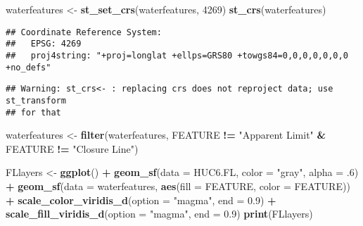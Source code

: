\documentclass[]{article}
\newenvironment{Shaded}{\begin{snugshade}}{\end{snugshade}}
\newcommand{\DataTypeTok}[1]{\textcolor[rgb]{0.13,0.29,0.53}{#1}}
\newcommand{\DecValTok}[1]{\textcolor[rgb]{0.00,0.00,0.81}{#1}}
\newcommand{\FloatTok}[1]{\textcolor[rgb]{0.00,0.00,0.81}{#1}}
\newcommand{\KeywordTok}[1]{\textcolor[rgb]{0.13,0.29,0.53}{\textbf{#1}}}
\newcommand{\NormalTok}[1]{#1}
\newcommand{\OperatorTok}[1]{\textcolor[rgb]{0.81,0.36,0.00}{\textbf{#1}}}
\newcommand{\StringTok}[1]{\textcolor[rgb]{0.31,0.60,0.02}{#1}}
\begin{document}
\begin{Shaded}
\begin{Highlighting}[]
\NormalTok{waterfeatures <-}\StringTok{ }\KeywordTok{st_set_crs}\NormalTok{(waterfeatures, }\DecValTok{4269}\NormalTok{)}
\KeywordTok{st_crs}\NormalTok{(waterfeatures)}
\end{Highlighting}
\end{Shaded}

\begin{verbatim}
## Coordinate Reference System:
##   EPSG: 4269 
##   proj4string: "+proj=longlat +ellps=GRS80 +towgs84=0,0,0,0,0,0,0 +no_defs"
\end{verbatim}

\begin{Shaded}
\end{Shaded}

\begin{verbatim}
## Warning: st_crs<- : replacing crs does not reproject data; use st_transform
## for that
\end{verbatim}

\begin{Shaded}
\begin{Highlighting}[]
\NormalTok{waterfeatures <-}\StringTok{ }\KeywordTok{filter}\NormalTok{(waterfeatures, FEATURE }\OperatorTok{!=}\StringTok{ "Apparent Limit"} \OperatorTok{&}\StringTok{ }\NormalTok{FEATURE }\OperatorTok{!=}\StringTok{ "Closure Line"}\NormalTok{)}

\NormalTok{FLlayers <-}\StringTok{ }\KeywordTok{ggplot}\NormalTok{() }\OperatorTok{+}
\StringTok{  }\KeywordTok{geom_sf}\NormalTok{(}\DataTypeTok{data =}\NormalTok{ HUC6.FL, }\DataTypeTok{color =} \StringTok{"gray"}\NormalTok{, }\DataTypeTok{alpha =} \FloatTok{.6}\NormalTok{) }\OperatorTok{+}
\StringTok{  }\KeywordTok{geom_sf}\NormalTok{(}\DataTypeTok{data =}\NormalTok{ waterfeatures, }\KeywordTok{aes}\NormalTok{(}\DataTypeTok{fill =}\NormalTok{ FEATURE, }\DataTypeTok{color =}\NormalTok{ FEATURE)) }\OperatorTok{+}
\StringTok{  }\KeywordTok{scale_color_viridis_d}\NormalTok{(}\DataTypeTok{option =} \StringTok{"magma"}\NormalTok{, }\DataTypeTok{end =} \FloatTok{0.9}\NormalTok{) }\OperatorTok{+}\StringTok{ }
\StringTok{  }\KeywordTok{scale_fill_viridis_d}\NormalTok{(}\DataTypeTok{option =} \StringTok{"magma"}\NormalTok{, }\DataTypeTok{end =} \FloatTok{0.9}\NormalTok{)}
\KeywordTok{print}\NormalTok{(FLlayers)}
\end{Highlighting}
\end{Shaded}
\end{document}
